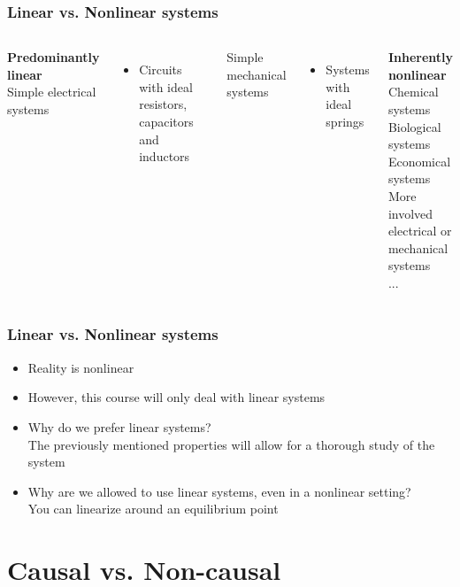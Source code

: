 \begin{frame}
	\frametitle{Linear vs. Nonlinear systems}
	\vspace{-8ex}
	\begin{columns}
		\textbf{\Large{Predominantly linear}}\\
		\medskip
		Simple electrical systems
		\begin{itemize}
			\item Circuits with ideal resistors, capacitors and inductors
		\end{itemize}
		Simple mechanical systems
		\begin{itemize}
			\item Systems with ideal springs
		\end{itemize}
		\bigskip
		
		\textbf{\Large{Inherently nonlinear}}\\
		\medskip
		Chemical systems\\
		\smallskip
		Biological systems\\
		\smallskip
		Economical systems\\
		\smallskip
		More involved electrical or mechanical systems\\
		\smallskip
		...
	\end{columns}
\end{frame}

\begin{frame}
	\frametitle{Linear vs. Nonlinear systems}
	\vspace{-6ex}
	\begin{itemize}
		\item Reality is nonlinear
		\item However, this course will only deal with linear systems
		\item Why do we prefer linear systems? \\
		\medskip
		The previously mentioned properties will allow for a thorough study of the system
		\item Why are we allowed to use linear systems, even in a nonlinear setting?\\
		\medskip
		You can linearize around an equilibrium point
	\end{itemize}
\end{frame}

\section{Causal vs. Non-causal} 

